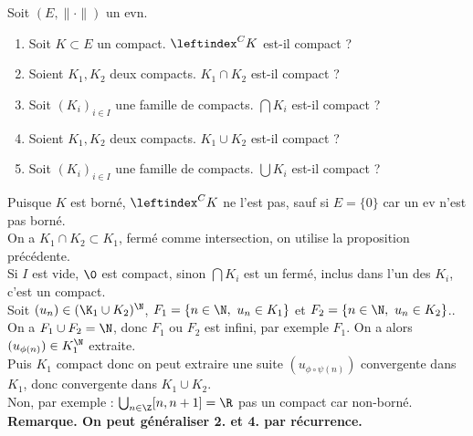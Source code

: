 \documentclass[11pt]{article}
\begin{document}
\begin{ex}{}{}
    Soit $(E,\|\cdot\|)$ un evn.
    \begin{enumerate}
        \item Soit $K\subset E$ un compact. $\leftindex^CK$ est-il compact ? 
        \item Soient $K_1,K_2$ deux compacts. $K_1\cap K_2$ est-il compact ?
        \item Soit $(K_i)_{i\in I}$ une famille de compacts. $\bigcap K_i$ est-il compact ?
        \item Soient $K_1,K_2$ deux compacts. $K_1\cup K_2$ est-il compact ?
        \item Soit $(K_i)_{i\in I}$ une famille de compacts. $\bigcup K_i$ est-il compact ?
    \end{enumerate}
    \tcblower
     Puisque $K$ est borné, $\leftindex^CK$ ne l'est pas, sauf si $E=\{0\}$ car un ev n'est pas borné.\\
     On a $K_1\cap K_2 \subset K_1$, fermé comme intersection, on utilise la proposition précédente.\\
     Si $I$ est vide, $\0$ est compact, sinon $\bigcap K_i$ est un fermé, inclus dans l'un des $K_i$, c'est un compact.\\
     Soit $(u_n)\in(\K_1\cup K_2)^\N$, $F_1=\{n\in\N, ~ u_n\in K_1\}$ et $F_2=\{n\in\N, ~ u_n \in K_2\}$..\\
    On a $F_1\cup F_2 = \N$, donc $F_1$ ou $F_2$ est infini, par exemple $F_1$. On a alors $(u_{\phi(n)})\in K_1^\N$ extraite.\\
    Puis $K_1$ compact donc on peut extraire une suite $(u_{\phi\circ\psi(n)})$ convergente dans $K_1$, donc convergente dans $K_1\cup K_2$.\\
     Non, par exemple : $\bigcup_{n\in\Z}[n,n+1]=\R$ pas un compact car non-borné.\\
    \bf{Remarque.} On peut généraliser 2. et 4. par récurrence.
\end{ex}
\end{document}
